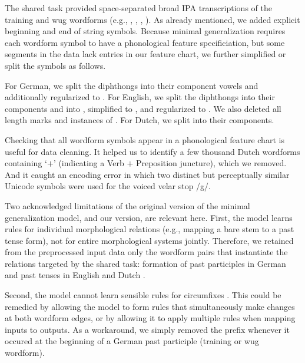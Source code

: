 \documentclass[11pt]{article}
\begin{document}
The shared task provided space-separated broad IPA transcriptions of the training and wug wordforms (e.g., , , , ). As already mentioned, we added explicit beginning and end of string symbols. Because minimal generalization requires each wordform symbol to have a phonological feature specificiation, but some segments in the data lack entries in our feature chart, we further simplified or split the symbols as follows.

For German, we split the diphthongs  into their component vowels and additionally regularized  to . For English, we split the diphthongs  into their components and \textipa{/3\textrhoticity/} into , simplified  to , and regularized  to . We also deleted all length marks \textipa{/:/} and instances of . For Dutch, we split  into their components.

Checking that all wordform symbols appear in a phonological feature chart is useful for data cleaning. It helped us to identify a few thousand  Dutch wordforms containing `$+$' (indicating a Verb $+$ Preposition juncture), which we removed. And it caught an encoding error in which two distinct but perceptually similar Unicode symbols were used for the voiced velar stop /g/.

Two acknowledged limitations of the original version of the minimal generalization model, and our version, are relevant here. First, the model learns rules for individual morphological relations (e.g., mapping a bare stem to a past tense form), not for entire morphological systems jointly. Therefore, we retained from the preprocessed input data only the wordform pairs that instantiate the relations targeted by the shared task: formation of past participles in German \citep{clahsen1999} and past tenses in English and Dutch \citep{booij2019}.

Second, the model cannot learn sensible rules for circumfixes \citep[][\S5.2]{albright-hayes-2002-modeling}. This could be remedied by allowing the model to form rules that simultaneously make changes at both wordform edges, or by allowing it to apply multiple rules when mapping inputs to outputs. As a workaround, we simply removed the prefix  whenever it occured at the beginning of a German past participle (training or wug wordform).
\end{document}
